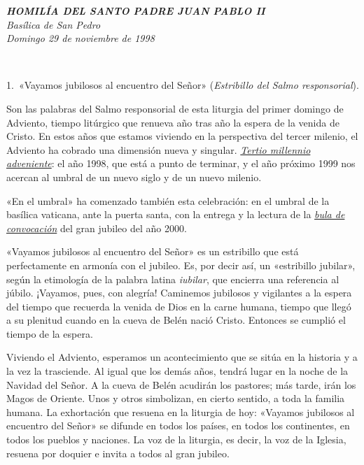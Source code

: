 \emph{\textbf{HOMILÍA DEL SANTO PADRE JUAN PABLO
		II\\[2\baselineskip]\hspace*{0.333em}}Basílica de San Pedro\\
	Domingo 29 de noviembre de 1998}

~

1.~«Vayamos jubilosos al encuentro del Señor» (\emph{Estribillo del
	Salmo responsorial}).

Son las palabras del Salmo responsorial de esta liturgia del primer
domingo de Adviento, tiempo litúrgico que renueva año tras año la espera
de la venida de Cristo. En estos años que estamos viviendo en la
perspectiva del tercer milenio, el Adviento ha cobrado una dimensión
nueva y singular.
\emph{\href{https://w2.vatican.va/content/john-paul-ii/es/apost_letters/1994/documents/hf_jp-ii_apl_19941110_tertio-millennio-adveniente.html}{Tertio
		millennio adveniente}}: el año 1998, que está a punto de terminar, y el
año próximo 1999 nos acercan al umbral de un nuevo siglo y de un nuevo
milenio.

«En el umbral» ha comenzado también esta celebración: en el umbral de la
basílica vaticana, ante la puerta santa, con la entrega y la lectura de
la
\emph{\href{http://w2.vatican.va/content/john-paul-ii/es/jubilee/documents/hf_jp-ii_doc_19981129_bolla-incarnationis-mysterium.html}{bula
		de convocación}} del gran jubileo del año 2000.

«Vayamos jubilosos al encuentro del Señor» es un estribillo que está
perfectamente en armonía con el jubileo. Es, por decir así, un
«estribillo jubilar», según la etimología de la palabra latina
\emph{iubilar}, que encierra una referencia al júbilo. ¡Vayamos, pues,
con alegría! Caminemos jubilosos y vigilantes a la espera del tiempo que
recuerda la venida de Dios en la carne humana, tiempo que llegó a su
plenitud cuando en la cueva de Belén nació Cristo. Entonces se cumplió
el tiempo de la espera.

Viviendo el Adviento, esperamos un acontecimiento que se sitúa en la
historia y a la vez la trasciende. Al igual que los demás años, tendrá
lugar en la noche de la Navidad del Señor. A la cueva de Belén acudirán
los pastores; más tarde, irán los Magos de Oriente. Unos y otros
simbolizan, en cierto sentido, a toda la familia humana. La exhortación
que resuena en la liturgia de hoy: «Vayamos jubilosos al encuentro del
Señor» se difunde en todos los países, en todos los continentes, en
todos los pueblos y naciones. La voz de la liturgia, es decir, la voz de
la Iglesia, resuena por doquier e invita a todos al gran jubileo.

